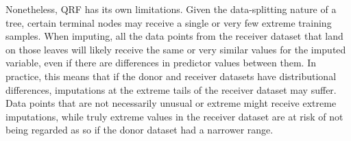 Nonetheless, QRF has its own limitations. Given the data-splitting nature of a tree, certain terminal nodes may receive a single or very few extreme training samples. When imputing, all the data points from the receiver dataset that land on those leaves will likely receive the same or very similar values for the imputed variable, even if there are differences in predictor values between them. In practice, this means that if the donor and receiver datasets have distributional differences, imputations at the extreme tails of the receiver dataset may suffer. Data points that are not necessarily unusual or extreme might receive extreme imputations, while truly extreme values in the receiver dataset are at risk of not being regarded as so if the donor dataset had a narrower range.